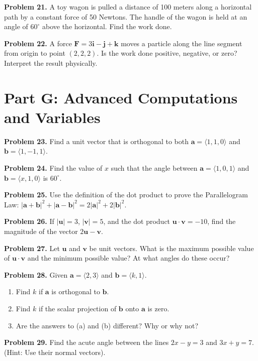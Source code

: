 \documentclass[12pt]{article}
\begin{document}
\textbf{Problem 21.} A toy wagon is pulled a distance of 100 meters along a horizontal path by a constant force of 50 Newtons. The handle of the wagon is held at an angle of $60^\circ$ above the horizontal. Find the work done.

\textbf{Problem 22.} A force $\mathbf{F} = 3\mathbf{i} - \mathbf{j} + \mathbf{k}$ moves a particle along the line segment from origin to point $(2, 2, 2)$. Is the work done positive, negative, or zero? Interpret the result physically.

\section*{Part G: Advanced Computations and Variables}

\textbf{Problem 23.} Find a unit vector that is orthogonal to both $\mathbf{a} = \langle 1, 1, 0 \rangle$ and $\mathbf{b} = \langle 1, -1, 1 \rangle$.

\textbf{Problem 24.} Find the value of $x$ such that the angle between $\mathbf{a} = \langle 1, 0, 1 \rangle$ and $\mathbf{b} = \langle x, 1, 0 \rangle$ is $60^\circ$.

\textbf{Problem 25.} Use the definition of the dot product to prove the Parallelogram Law: $|\mathbf{a} + \mathbf{b}|^2 + |\mathbf{a} - \mathbf{b}|^2 = 2|\mathbf{a}|^2 + 2|\mathbf{b}|^2$.

\textbf{Problem 26.} If $|\mathbf{u}| = 3$, $|\mathbf{v}| = 5$, and the dot product $\mathbf{u} \cdot \mathbf{v} = -10$, find the magnitude of the vector $2\mathbf{u} - \mathbf{v}$.

\textbf{Problem 27.} Let $\mathbf{u}$ and $\mathbf{v}$ be unit vectors. What is the maximum possible value of $\mathbf{u} \cdot \mathbf{v}$ and the minimum possible value? At what angles do these occur?

\textbf{Problem 28.} Given $\mathbf{a} = \langle 2, 3 \rangle$ and $\mathbf{b} = \langle k, 1 \rangle$.
\begin{enumerate}[label=(\alph*)]
    \item Find $k$ if $\mathbf{a}$ is orthogonal to $\mathbf{b}$.
    \item Find $k$ if the scalar projection of $\mathbf{b}$ onto $\mathbf{a}$ is zero.
    \item Are the answers to (a) and (b) different? Why or why not?
\end{enumerate}

\textbf{Problem 29.} Find the acute angle between the lines $2x - y = 3$ and $3x + y = 7$. (Hint: Use their normal vectors).
\end{document}
